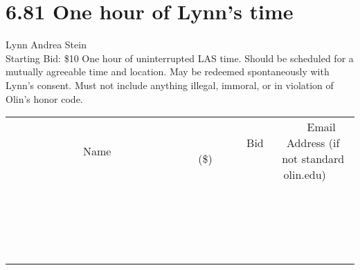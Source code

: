 \documentclass[11pt]{article}
\begin{document}
\section*{6.81 One hour of Lynn's time}
Lynn Andrea Stein
\\
Starting Bid: \$10
\newline
One hour of uninterrupted LAS time.  Should be scheduled for a mutually agreeable time and location.  May be redeemed spontaneously with Lynn's consent.  Must not include anything illegal, immoral, or in violation of Olin's honor code.
\\[3ex]
\begin{tabular}{c c c}
~~~~~~~~~~~~~Name~~~~~~~~~~~~~ & ~~~~~~~~~Bid (\$)~~~~~~~~~  & ~~~Email Address (if not standard olin.edu)~~~\\
 & & \\
\hline
 & & \\
\hline
 & & \\
\hline
 & & \\
\hline
 & & \\
\hline
 & & \\
\hline
 & & \\
\hline
 & & \\
\hline
 & & \\
\hline
 & & \\
\hline
 & & \\
\hline
 & & \\
\hline
 & & \\
\hline
 & & \\
\hline
 & & \\
\hline
 & & \\
\hline
 & & \\
\hline
 & & \\
\hline
 & & \\
\hline
\end{tabular}
\newpage
\end{document}
